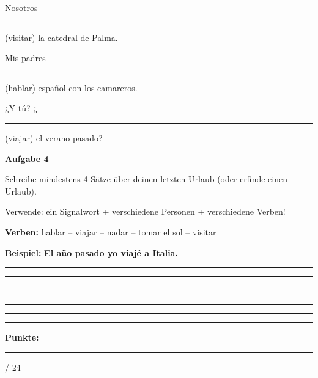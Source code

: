 \documentclass[11pt, a4paper]{article}
\newcommand{\fachfarbe}{spanisch}
\newcommand{\maxpunkte}{24}
\newcommand{\punktebox}[1]{\hfill\fbox{\small \_/#1}}
\newcommand{\luecke}[1]{\rule{#1}{0.4pt}}
\newenvironment{aufgabe}[1]{%
    \needspace{5\baselineskip}%
    \nopagebreak[4]%
    \vspace{10pt}
    \noindent\textbf{\textcolor{\fachfarbe}{Aufgabe #1}}
    \nopagebreak[4]%
    \vspace{5pt}
    \nopagebreak[4]%
    \begin{list}{}{\leftmargin=0pt}
    \item[]
}{%
    \end{list}
}
\newcommand{\es}[1]{\textcolor{\fachfarbe}{\textbf{#1}}}
\begin{document}
\vspace{0.5em}

\noindent
Nosotros \luecke{3cm} (visitar) la catedral de Palma.

\vspace{0.5em}

\noindent
Mis padres \luecke{3cm} (hablar) español con los camareros.

\vspace{0.5em}

\noindent
¿Y tú? ¿\luecke{3cm} (viajar) el verano pasado?

\vspace{15pt}


\begin{aufgabe}{4}
Schreibe mindestens 4 Sätze über deinen letzten Urlaub (oder erfinde einen Urlaub). \punktebox{8}
\end{aufgabe}

\begin{hinweis}
Verwende: ein Signalwort + verschiedene Personen + verschiedene Verben!
\end{hinweis}

\vspace{0.5em}

\begin{vokabelkasten}
\textbf{Verben:} hablar -- viajar -- nadar -- tomar el sol -- visitar

\textbf{Beispiel:} \es{El año pasado yo viajé a Italia.}
\end{vokabelkasten}

\vspace{0.5em}

\noindent
\rule{\textwidth}{0.4pt}\vspace{8pt}
\rule{\textwidth}{0.4pt}\vspace{8pt}
\rule{\textwidth}{0.4pt}\vspace{8pt}
\rule{\textwidth}{0.4pt}\vspace{8pt}
\rule{\textwidth}{0.4pt}\vspace{8pt}
\rule{\textwidth}{0.4pt}\vspace{8pt}


\vspace{20pt}
\hrule
\vspace{10pt}

\begin{flushright}
\textbf{Punkte:} \luecke{1cm} / \maxpunkte
\end{flushright}
\end{document}
